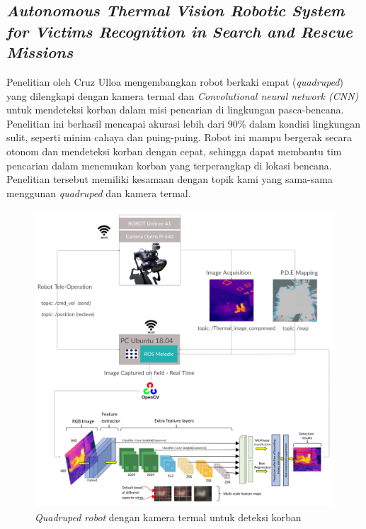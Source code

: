 \subsection{\emph{Autonomous Thermal Vision Robotic System for Victims Recognition in Search and Rescue Missions}}
Penelitian oleh Cruz Ulloa mengembangkan robot berkaki empat (\emph{quadruped}) yang dilengkapi dengan kamera termal dan \emph{Convolutional neural network (CNN)} untuk mendeteksi korban dalam misi pencarian di lingkungan pasca-bencana. Penelitian ini berhasil mencapai akurasi lebih dari 90\% dalam kondisi lingkungan sulit, seperti minim cahaya dan puing-puing. Robot ini mampu bergerak secara otonom dan mendeteksi korban dengan cepat, sehingga dapat membantu tim pencarian dalam menemukan korban yang terperangkap di lokasi bencana\cite{Cruz2021}. Penelitian tersebut memiliki kesamaan dengan topik kami yang sama-sama menggunan \emph{quadruped} dan kamera termal. 

\begin{figure} [H] \centering
  \includegraphics[scale=0.1]{gambar/unitreea1.png}
  \caption{\emph{Quadruped robot} dengan kamera termal untuk deteksi korban}
  \label{fig:Quadruped  dengan kamera termal untuk deteksi korban}
\end{figure}

\newpage